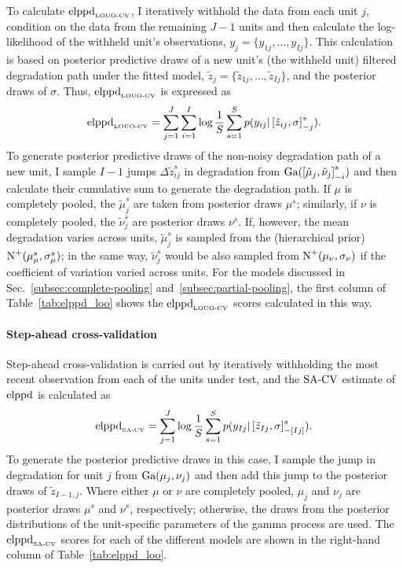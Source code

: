 To calculate $\hbox{elppd}_{\hbox{\tiny{LOUO-CV}}}$, I iteratively withhold the data from each unit $j$, condition on the data from the remaining $J-1$ units and then calculate the log-likelihood of the withheld unit's observations, $y_{j} = \{y_{1j}, \ldots, y_{Ij}\}$. This calculation is based on posterior predictive draws of a new unit's (the withheld unit) filtered degradation path under the fitted model, $\tilde{z}_{j} = \{\tilde{z}_{1j}, \ldots, \tilde{z}_{Ij}\}$, and the posterior draws of $\sigma$. Thus, $\hbox{elppd}_{\hbox{\tiny{LOUO-CV}}}$ is expressed as
\begin{equation} \label{eq:elppd_louo}
 \hbox{elppd}_{\hbox{\tiny{LOUO-CV}}} = \sum^J_{j = 1}\sum^{I}_{i = 1} \log \frac{1}{S} \sum^S_{s = 1} p(y_{ij} | \left[\Tilde{z}_{ij}, \sigma \right]_{-j}^s).
\end{equation}
To generate posterior predictive draws of the non-noisy degradation path of a new unit, I sample $I-1$ jumps $\Delta\tilde{z}^s_{ij}$ in degradation from $\hbox{Ga}(\left[\tilde{\mu}_j, \tilde{\nu}_j\right]_{-i}^s)$ and then calculate their cumulative sum to generate the degradation path. If $\mu$ is completely pooled, the $\tilde{\mu}^s_j$ are taken from posterior draws $\mu^s$; similarly, if $\nu$ is completely pooled, the $\tilde{\nu}^s_j$ are posterior draws $\nu^s$. If, however, the mean degradation varies across units, $\tilde{\mu}^s_j$ is sampled from the (hierarchical prior) $\hbox{N}^{+}(\mu^s_\mu, \sigma^s_\mu)$; in the same way, $\tilde{\nu}^s_j$ would be also sampled from $\hbox{N}^{+}(\mu_\nu, \sigma_\nu)$ if the coefficient of variation varied across units. For the models discussed in Sec.~\ref{subsec:complete-pooling} and~\ref{subsec:partial-pooling}, the first column of Table~\ref{tab:elppd_loo} shows the $\hbox{elppd}_{\hbox{\tiny{LOUO-CV}}}$ scores calculated in this way.

\paragraph{Step-ahead cross-validation}

Step-ahead cross-validation is carried out by iteratively withholding the most recent observation from each of the units under test, and the $\hbox{SA-CV}$ estimate of $\hbox{elppd}$ is calculated as
\begin{equation} \label{eq:elppd_sa_cv}
 \hbox{elppd}_{\hbox{\tiny{SA-CV}}} = \sum^{J}_{j = 1} \log \frac{1}{S} \sum^S_{s = 1} p(y_{Ij} | \left[\tilde{z}_{Ij}, \sigma \right]_{-\left[ Ij \right]}^s).
\end{equation}
To generate the posterior predictive draws in this case, I sample the jump in degradation for unit $j$ from $\hbox{Ga}(\mu_j, \nu_j)$ and then add this jump to the posterior draws of $\tilde{z}_{I-1,j}$. Where either $\mu$ or $\nu$ are completely pooled, $\mu_j$ and $\nu_j$ are posterior draws $\mu^s$ and $\nu^s$, respectively; otherwise, the draws from the posterior distributions of the unit-specific parameters of the gamma process are used. The $\hbox{elppd}_{\hbox{\tiny{SA-CV}}}$ scores for each of the different models are shown in the right-hand column of Table~\ref{tab:elppd_loo}.

